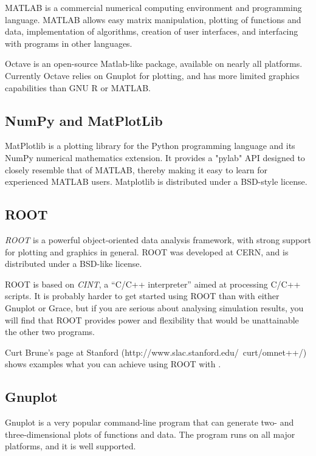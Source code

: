 MATLAB is a commercial numerical computing environment and programming language.
MATLAB allows easy matrix manipulation, plotting of functions and data,
implementation of algorithms, creation of user interfaces, and interfacing
with programs in other languages.

Octave is an open-source Matlab-like package, available on nearly all platforms.
Currently Octave relies on Gnuplot for plotting, and has more limited
graphics capabilities than GNU R or MATLAB.

\subsection{NumPy and MatPlotLib}

MatPlotlib is a plotting library for the Python programming language and
its NumPy numerical mathematics extension. It provides a "pylab" API designed
to closely resemble that of MATLAB, thereby making it easy to learn
for experienced MATLAB users. Matplotlib is distributed under a BSD-style
license.


\subsection{ROOT}

\textit{ROOT} is a powerful object-oriented data analysis framework,
with strong support for plotting and graphics in general.
ROOT was developed at CERN, and is distributed under a BSD-like license.

ROOT is based on \textit{CINT}, a ``C/C++ interpreter''
aimed at processing C/C++ scripts. It is probably harder to get started
using ROOT than with either Gnuplot or Grace, but if you are serious
about analysing simulation results, you will find that ROOT provides
power and flexibility that would be unattainable the other two programs.

Curt Brune's page at Stanford (http://www.slac.stanford.edu/~curt/omnet++/)
shows examples what you can achieve using ROOT with {\opp}.


\subsection{Gnuplot}
\label{sec:ana-sim:gnuplot}

Gnuplot is a very popular command-line program that can generate two-
and three-dimensional plots of functions and data. The program runs
on all major platforms, and it is well supported.

